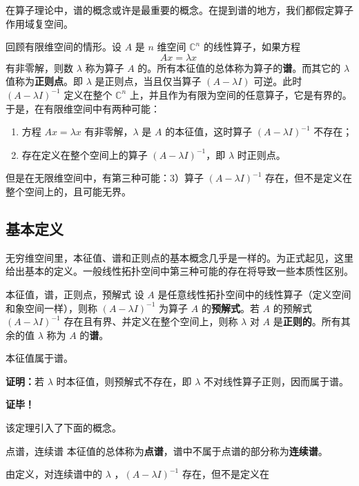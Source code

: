 
\cite{Ke1}在算子理论中，谱的概念或许是最重要的概念。在提到谱的地方，我们都假定算子作用域复空间。

回顾有限维空间的情形。设 $A$ 是 $n$ 维空间 $\mathbb C^n$ 的线性算子，如果方程
\begin{equation}
Ax=\lambda x~
\end{equation}
有非零解，则数 $\lambda$ 称为算子 $A$ 的。所有本征值的总体称为算子的\textbf{谱}。而其它的 $\lambda$ 值称为\textbf{正则点}。即 $\lambda$ 是正则点，当且仅当算子 $(A-\lambda I)$ 可逆。此时 $(A-\lambda I)^{-1}$ 定义在整个 $\mathbb C^n$ 上，并且作为有限为空间的任意算子，它是有界的。于是，在有限维空间中有两种可能：
\begin{enumerate}
\item 方程 $Ax=\lambda x$ 有非零解，$\lambda$ 是 $A$ 的本征值，这时算子 $(A-\lambda I)^{-1}$ 不存在；
\item 存在定义在整个空间上的算子 $(A-\lambda I)^{-1}$，即 $\lambda$ 时正则点。
\end{enumerate}

但是在无限维空间中，有第三种可能：3）算子 $(A-\lambda I)^{-1}$ 存在，但不是定义在整个空间上的，且可能无界。
\subsection{基本定义}
无穷维空间里，本征值、谱和正则点的基本概念几乎是一样的。为正式起见，这里给出基本的定义。一般线性拓扑空间中第三种可能的存在将导致一些本质性区别。
\begin{definition}{本征值，谱，正则点，预解式}
设 $A$ 是任意线性拓扑空间中的线性算子（定义空间和象空间一样），则称 $(A-\lambda I)^{-1}$ 为算子 $A$ 的\textbf{预解式}。若 $A$ 的预解式 $(A-\lambda I)^{-1}$ 存在且有界、并定义在整个空间上，则称 $\lambda$ 对 $A$ 是\textbf{正则的}。所有其余的值 $\lambda$ 称为 $A$ 的\textbf{谱}。
\end{definition}

\begin{theorem}{}
本征值属于谱。
\end{theorem}

\textbf{证明：}若 $\lambda$ 时本征值，则预解式不存在，即 $\lambda$ 不对线性算子正则，因而属于谱。

\textbf{证毕！}

该定理引入了下面的概念。
\begin{definition}{点谱，连续谱}
本征值的总体称为\textbf{点谱}，谱中不属于点谱的部分称为\textbf{连续谱}。
\end{definition}
由定义，对连续谱中的 $\lambda$ ，$(A-\lambda I)^{-1}$ 存在，但不是定义在

